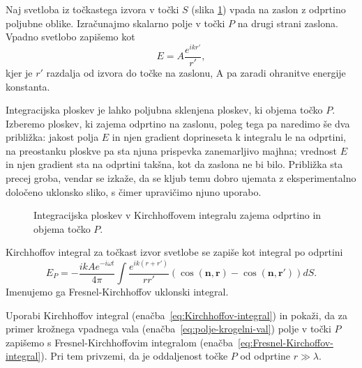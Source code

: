 Naj svetloba iz točkastega izvora v točki $S$ (slika \ref{fig:UklonFK}) vpada na zaslon
z odprtino poljubne oblike. Izračunajmo skalarno polje v točki $P$ na drugi 
strani zaslona. Vpadno svetlobo zapišemo kot
\begin{equation}
\label{eq:polje-krogelni-val}
E = A \frac{e^{ikr'}}{r'},
\end{equation}
kjer je $r'$ razdalja od izvora do točke na zaslonu, A pa zaradi ohranitve energije konstanta.

Integracijska ploskev je lahko poljubna sklenjena ploskev, ki objema točko $P$. 
Izberemo ploskev, ki zajema odprtino na zaslonu, poleg tega pa naredimo še dva približka:
jakost polja $E$ in njen gradient doprineseta k integralu le na odprtini, na preostanku ploskve
pa sta njuna prispevka zanemarljivo majhna; vrednost $E$ in njen gradient sta na 
odprtini takšna, kot da zaslona ne bi bilo.
Približka sta precej groba, vendar se izkaže, da se kljub temu
dobro ujemata z eksperimentalno določeno uklonsko sliko, s čimer 
upravičimo njuno uporabo.
\begin{figure}[h]
\centering {} 
  
\caption{Integracijska ploskev v Kirchhoffovem integralu zajema odprtino in objema točko $P$.}
\label{fig:UklonFK}
\end{figure}

Kirchhoffov integral za točkast izvor svetlobe se zapiše kot integral po odprtini
\begin{equation}
E_P = -\frac{ik A e^{-i\omega t}}{4\pi}\int\frac{e^{ik(r+r')}}{rr'}\left(\cos(\mathbf{n},
\mathbf{r})-\cos(\mathbf{n},\mathbf{r'})\right) dS.
\label{eq:Fresnel-Kirchoffov-integral}
\end{equation}
Imenujemo ga Fresnel-Kirchhoffov uklonski integral.
\begin{definition}
\label{naloga-Fresnel-Kirchhoff-uklon}
Uporabi Kirchhoffov integral (enačba~\ref{eq:Kirchhoffov-integral}) in pokaži, da 
za primer krožnega vpadnega vala (enačba~\ref{eq:polje-krogelni-val}) polje v točki 
$P$ zapišemo s Fresnel-Kirchhoffovim integralom (enačba~\ref{eq:Fresnel-Kirchoffov-integral}). 
Pri tem privzemi, da je oddaljenost točke $P$ od odprtine $r \gg \lambda$.
\end{definition}

